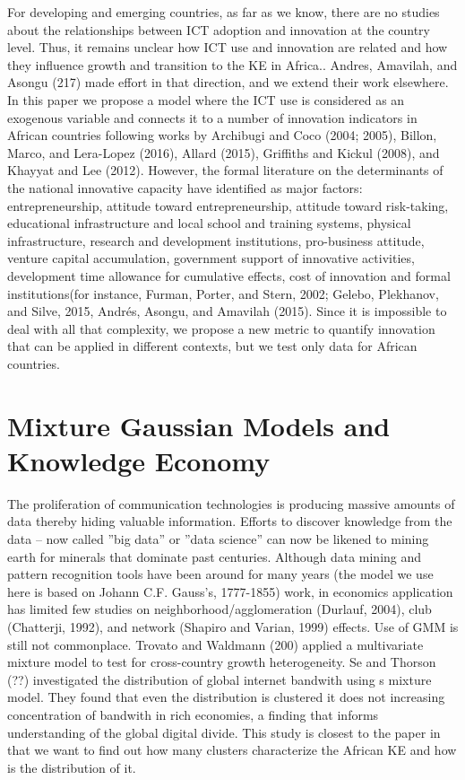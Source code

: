 \documentclass[11pt]{article}
\begin{document}
{For developing and emerging countries, as far as we know, there are no studies about the relationships between ICT adoption and innovation at the country level. Thus, it remains unclear how ICT use and innovation are related and how they influence growth and transition to the KE in Africa.. Andres, Amavilah, and Asongu (217) made effort in that direction, and we extend their work elsewhere. In this paper we propose a model where the ICT use is considered as an exogenous variable and connects it to a number of innovation indicators in African countries following works by Archibugi and Coco (2004; 2005), Billon, Marco, and Lera-Lopez (2016), Allard (2015), Griffiths and Kickul (2008), and Khayyat and Lee (2012). However, the formal literature on the determinants of the national innovative capacity have identified as major factors: entrepreneurship, attitude toward entrepreneurship, attitude toward risk-taking, educational infrastructure and local school and training systems, physical infrastructure, research and development institutions, pro-business attitude, venture capital accumulation, government support of innovative activities, development time allowance for cumulative effects, cost of innovation and formal institutions(for instance, Furman, Porter, and Stern, 2002; Gelebo, Plekhanov, and Silve, 2015, Andrés, Asongu, and Amavilah (2015). Since it is impossible to deal with all that complexity, we propose a new metric to quantify innovation that can be applied in different contexts, but we test only data for African countries. 

\section{Mixture Gaussian Models and Knowledge Economy }

The proliferation of communication technologies is producing massive amounts of data thereby hiding valuable information. Efforts to discover knowledge from the data – now called ''big data'' or ''data science'' can now be likened to mining earth for minerals that dominate past centuries. Although data mining and pattern recognition tools have been around for many years (the model we use here is based on Johann C.F. Gauss’s, 1777-1855) work, in economics application has limited few studies on neighborhood/agglomeration (Durlauf, 2004), club (Chatterji, 1992), and network (Shapiro and Varian, 1999) effects. Use of GMM is still not commonplace. Trovato and Waldmann (200) applied a multivariate mixture model to test for cross-country growth heterogeneity. Se and Thorson (??) investigated the distribution of global internet bandwith using s mixture model. They found that even the distribution is clustered it does not increasing concentration of bandwith in rich economies, a finding that informs understanding of the global digital divide. This study is closest to the paper in that we want to find out how many clusters characterize the African KE and how is the distribution of it.

}
\end{document}
